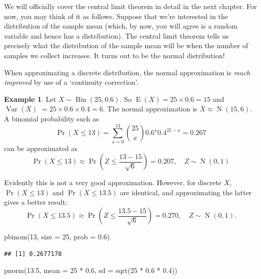 \documentclass[
]{book}
\newenvironment{Shaded}{\begin{snugshade}}{\end{snugshade}}
\newcommand{\AttributeTok}[1]{\textcolor[rgb]{0.77,0.63,0.00}{#1}}
\newcommand{\DecValTok}[1]{\textcolor[rgb]{0.00,0.00,0.81}{#1}}
\newcommand{\FloatTok}[1]{\textcolor[rgb]{0.00,0.00,0.81}{#1}}
\newcommand{\FunctionTok}[1]{\textcolor[rgb]{0.00,0.00,0.00}{#1}}
\newcommand{\NormalTok}[1]{#1}
\newcommand{\SpecialCharTok}[1]{\textcolor[rgb]{0.00,0.00,0.00}{#1}}
\DeclareMathOperator{\E}{E}
\DeclareMathOperator{\Var}{Var}
\DeclareMathOperator{\N}{N}
\DeclareMathOperator{\Bin}{Bin}
\theoremstyle{definition}
\theoremstyle{definition}
\newtheorem{example}{Example}[chapter]
\theoremstyle{definition}
\theoremstyle{definition}
\theoremstyle{remark}
\begin{document}
We will officially cover the central limit theorem in detail in the next chapter. For now, you may think of it as follows. Suppose that we're interested in the distribution of the sample mean (which, by now, you will agree is a random variable and hence has a distribution). The central limit theorem tells us precisely what the distribution of the sample mean will be when the number of samples we collect increases. It turns out to be the normal distribution!

When approximating a discrete distribution, the normal approximation is \emph{much improved} by use of a `continuity correction'.

\begin{example}
Let \(X\sim\Bin(25, 0.6)\). So \(\E(X)=25\times 0.6=15\) and \(\Var(X)\) \(=25\times0.6\times 0.4=6\). The normal approximation is \(X \approx \N(15, 6)\).
A binomial probability such as
\[
\Pr(X\leq 13)=\sum_{x=0}^{13} {25 \choose x} 0.6^x0.4^{25-x}=0.267
\]
can be approximated as
\[
\Pr(X\leq 13)\approx \Pr\left(Z \leq \frac{13-15}{\sqrt 6}\right)=0.207, \hspace{1em} Z\sim\N(0,1)
\]

Evidently this is not a very good approximation. However, for discrete \(X\), \(\Pr(X\leq 13)\) and \(\Pr(X\leq 13.5)\) are identical, and approximating the latter gives a better result:
\[
\Pr(X\leq 13.5)\approx \Pr\left(Z \leq \frac{13.5-15}{\sqrt 6}\right)=0.270, \hspace{1em} Z\sim\N(0,1).
\]
\end{example}

\begin{Shaded}
\begin{Highlighting}[]
\FunctionTok{pbinom}\NormalTok{(}\DecValTok{13}\NormalTok{, }\AttributeTok{size =} \DecValTok{25}\NormalTok{, }\AttributeTok{prob =} \FloatTok{0.6}\NormalTok{)}
\end{Highlighting}
\end{Shaded}

\begin{verbatim}
## [1] 0.2677178
\end{verbatim}

\begin{Shaded}
\begin{Highlighting}[]
\FunctionTok{pnorm}\NormalTok{(}\FloatTok{13.5}\NormalTok{, }\AttributeTok{mean =} \DecValTok{25} \SpecialCharTok{*} \FloatTok{0.6}\NormalTok{, }\AttributeTok{sd =} \FunctionTok{sqrt}\NormalTok{(}\DecValTok{25} \SpecialCharTok{*} \FloatTok{0.6} \SpecialCharTok{*} \FloatTok{0.4}\NormalTok{))}
\end{Highlighting}
\end{Shaded}
\end{document}
